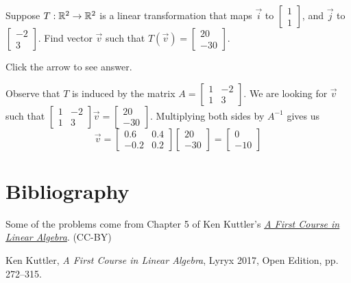 \documentclass{ximera}
\begin{document}
\begin{problem}\label{prob:invImageOfVect}
    Suppose $T:\mathbb{R}^2\rightarrow \mathbb{R}^2$ is a linear transformation that maps $\vec{i}$ to $\begin{bmatrix}1\\1\end{bmatrix}$, and $\vec{j}$ to $\begin{bmatrix}-2\\3\end{bmatrix}$.  Find vector $\vec{v}$ such that $T(\vec{v})=\begin{bmatrix}20\\-30\end{bmatrix}$.

    Click the arrow to see answer.

    \begin{expandable}
        Observe that $T$ is induced by the matrix $A=\begin{bmatrix}1 & -2\\1 & 3\end{bmatrix}$.  We are looking for $\vec{v}$ such that $\begin{bmatrix}1 & -2\\1 & 3\end{bmatrix}\vec{v}=\begin{bmatrix}20\\-30\end{bmatrix}$.  Multiplying both sides by $A^{-1}$ gives us
        $$\vec{v}=\begin{bmatrix}
            0.6 & 0.4\\
 -0.2 & 0.2
        \end{bmatrix}\begin{bmatrix}20\\-30\end{bmatrix}=\begin{bmatrix}0\\-10\end{bmatrix}$$
    \end{expandable}
\end{problem}




\section*{Bibliography}
Some of the problems come from Chapter 5 of Ken Kuttler's \href{https://open.umn.edu/opentextbooks/textbooks/a-first-course-in-linear-algebra-2017}{\it A First Course in Linear Algebra}. (CC-BY)

Ken Kuttler, {\it  A First Course in Linear Algebra}, Lyryx 2017, Open Edition, pp. 272--315. 
\end{document}
